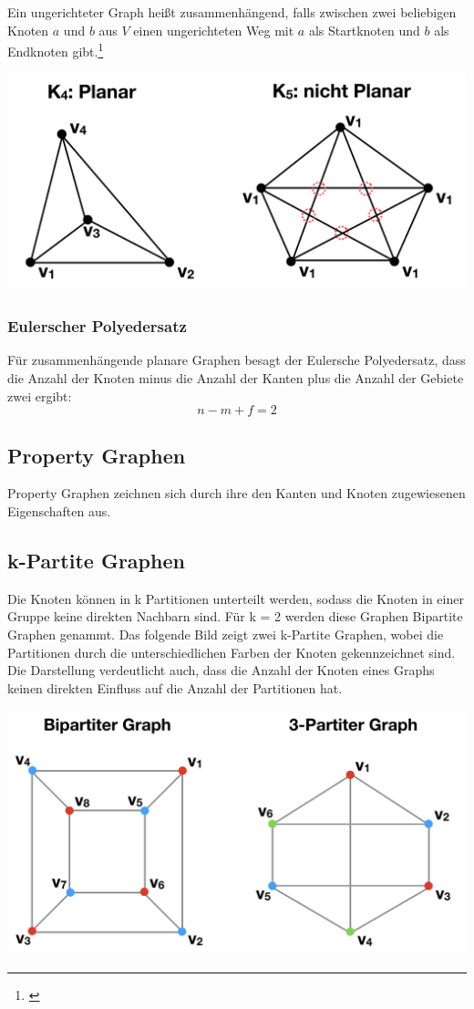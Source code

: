 Ein ungerichteter Graph heißt zusammenhängend, falls zwischen zwei beliebigen Knoten $a$ und $b$ aus $V$ einen ungerichteten Weg mit $a$ als Startknoten und $b$ als Endknoten gibt.\footnote{\cite[36-38]{krumke2012graphentheoretische}}
\begin{center}
	\includegraphics[scale = 0.5]{./images/planarer_graph.png}
\end{center}
\subsubsection{Eulerscher Polyedersatz}
Für zusammenhängende planare Graphen besagt der Eulersche Polyedersatz, dass die Anzahl der Knoten minus die Anzahl der Kanten plus die Anzahl der Gebiete zwei ergibt:
\[ n - m + f = 2 \]
\subsection{Property Graphen}
Property Graphen zeichnen sich durch ihre den Kanten und Knoten zugewiesenen Eigenschaften aus.
\subsection{k-Partite Graphen}
Die Knoten können in k Partitionen unterteilt werden, sodass die Knoten in einer Gruppe keine direkten Nachbarn sind.
Für k = 2 werden diese Graphen Bipartite Graphen genammt.
Das folgende Bild zeigt zwei k-Partite Graphen, wobei die Partitionen durch die unterschiedlichen Farben der Knoten gekennzeichnet sind.
Die Darstellung verdeutlicht auch, dass die Anzahl der Knoten eines Graphs keinen direkten Einfluss auf die Anzahl der Partitionen hat.
\begin{center}
	\includegraphics[scale = 0.4]{./images/k_partiter_graph.png}
\end{center}
